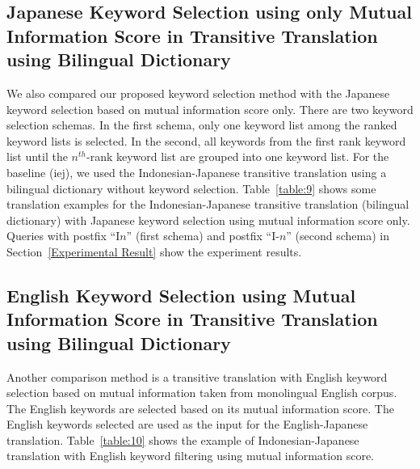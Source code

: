 \documentclass[english]{jnlp_1.3c}
\begin{document}
\subsection{Japanese Keyword Selection using only Mutual Information  Score in Transitive Translation using Bilingual Dictionary}
\label{Japanese Keyword Selection using only Mutual Information Score in
Transitive Translation using Bilingual Dictionary} We also compared our
proposed keyword selection method with the Japanese keyword selection
based on mutual information score only. There are two keyword selection
schemas. In the first schema, only one keyword list among the ranked
keyword lists is selected. In the second, all keywords from the first
rank keyword list until the $n^{th}$-rank keyword list are grouped into one
keyword list. For the baseline (iej), we used the Indonesian-Japanese
transitive translation using a bilingual dictionary without keyword
selection. Table~\ref{table:9} shows some translation examples for the
Indonesian-Japanese transitive translation (bilingual dictionary) with
Japanese keyword selection using mutual information score only. Queries
with postfix ``I$n$'' (first schema) and postfix ``I-$n$'' (second schema)
in Section~\ref{Experimental Result} show the experiment results.


\subsection{English Keyword Selection using Mutual Information Score in Transitive Translation using Bilingual Dictionary}
\label{English Keyword Selection using Mutual Information Score in Transitive Translation using Bilingual Dictionary}

Another comparison method is a transitive translation with English
keyword selection based on mutual information taken from monolingual
English corpus. The English keywords are selected based on its mutual
information score. The English keywords selected are used as the input
for the English-Japanese translation. Table~\ref{table:10} shows the
example of Indonesian-Japanese translation with English keyword
filtering using mutual information score.
\end{document}
